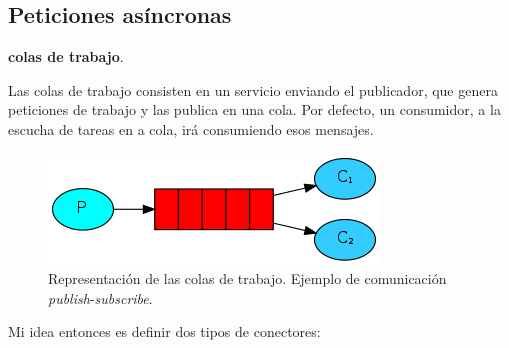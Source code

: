 \subsection{Peticiones asíncronas}

\textbf{colas de trabajo}. \cite{royChapterMessagePatterns2017}

Las colas de trabajo consisten en un servicio enviando el publicador, que genera peticiones de trabajo y las publica en una cola. Por defecto, un consumidor, a la escucha de tareas en a cola, irá consumiendo esos mensajes.

\begin{figure}
  \centering
  \includegraphics[scale=0.75]{03_arquitectura/images/work-queues}
  \caption[Representación de las colas de trabajo. Ejemplo de comunicación \emph{publish}-\emph{subscribe}.]{Representación de las colas de trabajo. Ejemplo de comunicación \emph{publish}-\emph{subscribe}. \footnotemark }
  \label{fig:work-queues}
\end{figure}


Mi idea entonces es definir dos tipos de conectores:

